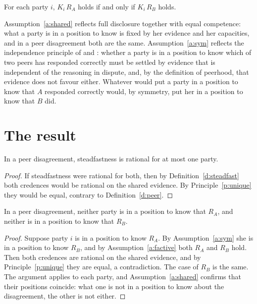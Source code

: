 \documentclass{situationist-preprint}
\begin{document}
\begin{assumption}[Symmetry]\label{a:sym}
For each party $i$, $K_i\,R_A$ holds if and only if $K_i\,R_B$ holds.
\end{assumption}

Assumption~\ref{a:shared} reflects full disclosure together with equal competence: what a party is in a position to know is fixed by her evidence and her capacities, and in a peer disagreement both are the same. Assumption~\ref{a:sym} reflects the independence principle of \citet{Elga2007} and \citet{Christensen2007}: whether a party is in a position to know which of two peers has responded correctly must be settled by evidence that is independent of the reasoning in dispute, and, by the definition of peerhood, that evidence does not favour either. Whatever would put a party in a position to know that $A$ responded correctly would, by symmetry, put her in a position to know that $B$ did.

\section{The result}

\begin{theorem}\label{t:atmost}
In a peer disagreement, steadfastness is rational for at most one party.
\end{theorem}

\begin{proof}
If steadfastness were rational for both, then by Definition~\ref{d:steadfast} both credences would be rational on the shared evidence. By Principle~\ref{p:unique} they would be equal, contrary to Definition~\ref{d:peer}.
\end{proof}

\begin{theorem}\label{t:neither}
In a peer disagreement, neither party is in a position to know that $R_A$, and neither is in a position to know that $R_B$.
\end{theorem}

\begin{proof}
Suppose party $i$ is in a position to know $R_A$. By Assumption~\ref{a:sym} she is in a position to know $R_B$, and by Assumption~\ref{a:factive} both $R_A$ and $R_B$ hold. Then both credences are rational on the shared evidence, and by Principle~\ref{p:unique} they are equal, a contradiction. The case of $R_B$ is the same. The argument applies to each party, and Assumption~\ref{a:shared} confirms that their positions coincide: what one is not in a position to know about the disagreement, the other is not either.
\end{proof}
\end{document}
